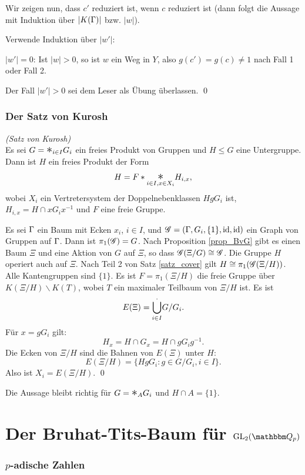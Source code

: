 \documentclass[a4paper, 12pt, twoside]{article}
\begin{document}
\begin{enumerate}
Wir zeigen nun, dass $c'$ reduziert ist, wenn $c$ reduziert ist
(dann folgt die Aussage mit Induktion über $|K(\Gamma)|$ bzw. $|w|$).

Verwende Induktion über $|w'|$:

$|w'|=0$: Ist $|w|>0$, so ist $w$ ein Weg in $Y$, also
$g(c')=g(c)\neq 1$ nach Fall 1 oder Fall 2.

Der Fall $|w'|>0$ sei dem Leser als Übung überlassen.
\qed
\end{enumerate}

\section{Der Satz von Kurosh}\label{sec_kurosh}

\SATZ \emph{(Satz von Kurosh)}\\
Es sei $G=\text{\Large$*$}_{i\in I} G_i$ ein freies Produkt von Gruppen und
$H\leq G$ eine Untergruppe. Dann ist $H$ ein freies Produkt der
Form
\[
H = F * \underset{i\in I, x\in X_i}{\text{\Large$*$}} H_{i,x},
\]
wobei $X_i$ ein Vertretersystem der Doppelnebenklassen $H g G_i$ ist,
$H_{i,x} = H \cap x G_i x^{-1}$ und $F$ eine freie Gruppe.

\bew Es sei $\Gamma$ ein Baum mit Ecken $x_i$, $i\in I$, und
$\mathscr{G}=(\Gamma,G_i,\{1\},\mathrm{id},\mathrm{id})$ ein Graph von Gruppen auf $\Gamma$.
Dann ist $\pi_1(\mathscr{G})=G$.
Nach Proposition \ref{prop_BvG} gibt es einen Baum $\Xi$ und
eine Aktion von $G$ auf $\Xi$, so dass $\mathscr{G}(\Xi/G)\cong \mathscr{G}$.
Die Gruppe $H$ operiert auch auf $\Xi$. Nach Teil 2 von
Satz \ref{satz_cover} gilt $H\cong \pi_1(\mathscr{G}(\Xi/H))$.
Alle Kantengruppen sind $\{1\}$.
Es ist $F=\pi_1(\Xi/H)$ die freie Gruppe über $K(\Xi/H)\backslash K(T)$,
wobei $T$ ein maximaler Teilbaum von $\Xi/H$ ist.
Es ist
\[
E(\Xi)=\overset{.}{\underset{i\in I}{\mathop{\bigcup}}} G/G_i.
\]
Für $x=g G_i$ gilt:
\[
H_x = H \cap G_x = H \cap g G_i g^{-1}.
\]
Die Ecken von $\Xi/H$ sind die Bahnen von $E(\Xi)$ unter $H$:
\[
E(\Xi/H) = \{ H g G_i : g \in G/G_i, i\in I \}.
\]
Also ist $X_i=E(\Xi/H)$.
\qed

Die Aussage bleibt richtig für $G=\text{\Large$*$}_A G_i$ und $H\cap A =\{1\}$.

\cleardoublepage
\part{Der Bruhat-Tits-Baum für $\GL_2(\QQ_p)$}

\section{$p$-adische Zahlen}\label{sec_padisch}
\end{document}
